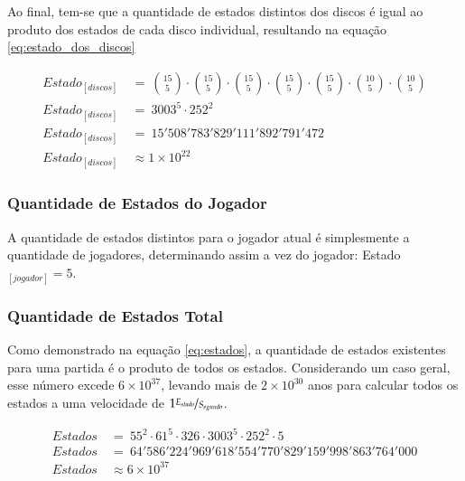 Ao final, tem-se que a quantidade de estados distintos dos discos é igual ao produto dos estados de cada disco individual, resultando na equação \ref{eq:estado_dos_discos}

\begin{equation} \label{eq:estado_dos_discos} \tag{e.q. Estado dos discos}
\begin{split}
	Estado_{[discos]}\ &=\ \binom{15}{5}\cdot\binom{15}{5}\cdot\binom{15}{5}\cdot\binom{15}{5}\cdot\binom{15}{5}\cdot\binom{10}{5}\cdot\binom{10}{5}\\
	Estado_{[discos]}\ &=\ 3003^5\cdot252^2\\
	Estado_{[discos]}\ &=\ 15'508'783'829'111'892'791'472\\
	Estado_{[discos]}\ &\approx 1\times 10^{22}
\end{split}
\end{equation}

\subsubsection{Quantidade de Estados do Jogador}

A quantidade de estados distintos para o jogador atual é simplesmente a quantidade de jogadores, determinando assim a vez do jogador: Estado$_{[jogador]}=5$.

\subsubsection{Quantidade de Estados Total}

Como demonstrado na equação \ref{eq:estados}, a quantidade de estados existentes para uma partida é o produto de todos os estados. Considerando um caso geral, esse número excede $6\times 10^{37}$, levando mais de $2\times 10^{30}$ anos para calcular todos os estados a uma velocidade de $1 \nicefrac{E_{stado}}{S_{egundo}}$.

\begin{equation} \label{eq:estados} \tag{e.q. Caso Geral}
\begin{split}
	Estados\ &=\ 55^{2}\cdot61^{5}\cdot326\cdot3003^{5}\cdot252^{2}\cdot5\\
	Estados\ &=\ 64'586'224'969'618'554'770'829'159'998'863'764'000\\
	Estados\ &\approx 6\times 10^{37}
\end{split}
\end{equation}

